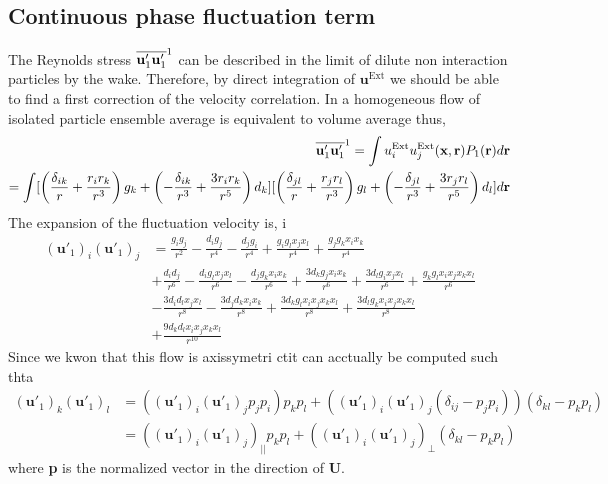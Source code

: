 \subsection*{Continuous phase fluctuation term}

The Reynolds stress $\overline{\textbf{u}_1'\textbf{u}_1'}^1$ can be described in the limit of dilute non interaction particles by the wake. 
Therefore, by direct integration of $\textbf{u}^\text{Ext}$ we should be able to find a first correction of the velocity correlation. 
In a homogeneous flow of isolated particle ensemble average is equivalent to volume average thus, 
\begin{align*}
    \overline{\textbf{u}_1' \textbf{u}_1' }^1
    = \int u_i^\text{Ext} u_j^\text{Ext}(\textbf{x},\textbf{r}) P_1(\textbf{r}) d\textbf{r}\\
    = \int [\left(\frac{\delta_{ik}}{r} + \frac{r_ir_k}{r^3}\right)  g_k
    + \left(-\frac{\delta_{ik}}{r^3} + \frac{3r_ir_k}{r^5}\right)  d_k]
    [ \left(\frac{\delta_{jl}}{r} + \frac{r_jr_l}{r^3}\right)  g_l
    + \left(-\frac{\delta_{jl}}{r^3} + \frac{3r_jr_l}{r^5}\right)  d_l] d\textbf{r}
\end{align*}
The expansion of the fluctuation velocity is, i
\begin{align*}
    (\textbf{u}'_1)_i 
    (\textbf{u}'_1)_j
    &=
    \frac{g_i g_j}{r^{2}} 
    - \frac{d_i g_j}{r^{4}} 
    - \frac{d_j g_i}{r^{4}} 
    + \frac{g_i g_l x_j x_l}{r^{4}} 
    + \frac{g_j g_k x_i x_k}{r^{4}} \\
    &+ \frac{d_i d_j}{r^{6}} 
    - \frac{d_i g_l x_j x_l}{r^{6}} 
    - \frac{d_j g_k x_i x_k}{r^{6}} 
    + \frac{3 d_k g_j x_i x_k}{r^{6}} 
    + \frac{3 d_l g_i x_j x_l}{r^{6}} 
    + \frac{g_k g_l x_i x_j x_k x_l}{r^{6}} \\
    &- \frac{3 d_i d_l x_j x_l}{r^{8}} 
    - \frac{3 d_j d_k x_i x_k}{r^{8}} 
    + \frac{3 d_k g_l x_i x_j x_k x_l}{r^{8}} 
    + \frac{3 d_l g_k x_i x_j x_k x_l}{r^{8}} \\
    &+ \frac{9 d_k d_l x_i x_j x_k x_l}{r^{10}} 
\end{align*}
Since we kwon that this flow is axissymetri ctit can acctually be computed such thta
\begin{align*}
    (\textbf{u}'_1)_k 
    (\textbf{u}'_1)_l
    &= 
    ((\textbf{u}'_1)_i 
    (\textbf{u}'_1)_j p_j p_i) p_k p_l 
    + 
    ((\textbf{u}'_1)_i 
    (\textbf{u}'_1)_j (\delta_{ij} - p_j p_i))(\delta_{kl} -  p_k p_l )\\
    &= 
    ((\textbf{u}'_1)_i 
    (\textbf{u}'_1)_j )_{||} p_k p_l 
    + 
    ((\textbf{u}'_1)_i 
    (\textbf{u}'_1)_j )_{\bot}(\delta_{kl} -  p_k p_l )
\end{align*} 
where \textbf{p} is the normalized vector in the direction of \textbf{U}. 

